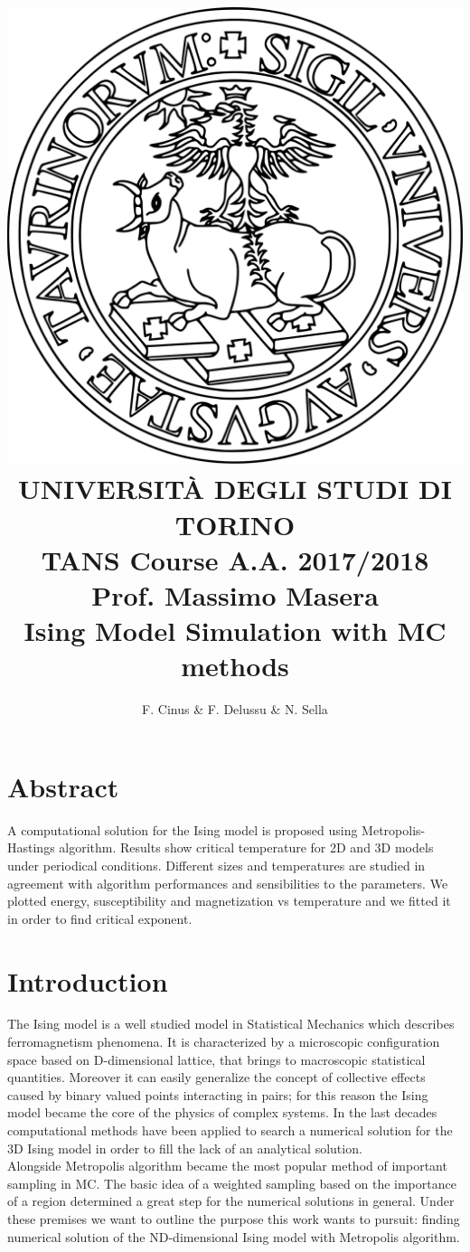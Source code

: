 \documentclass[11pt,a4paper]{article}
\author{F. Cinus \& F. Delussu \& N. Sella}
\title{\includegraphics[scale=0.12]{Unito-logo} \\ \LARGE{UNIVERSIT\`{A} DEGLI STUDI DI TORINO}
  \\
  TANS Course A.A. 2017/2018 Prof. Massimo Masera
  \\
  \textbf{Ising Model Simulation with MC methods}
}
\begin{document}
\date{}
\maketitle
\bigskip
\section*{Abstract}
A computational solution for the Ising model is proposed using Metropolis-Hastings algorithm. Results show critical temperature for 2D and 3D models under periodical conditions. Different sizes and temperatures are studied in agreement with algorithm performances and sensibilities to the parameters. We plotted energy, susceptibility and magnetization vs temperature and we fitted it in order to find critical exponent.


\newpage
\section*{Introduction}
The Ising model is a well studied model in Statistical Mechanics which describes ferromagnetism phenomena. It is characterized by a microscopic configuration space based on D-dimensional lattice, that brings to macroscopic statistical quantities. Moreover it can easily generalize the concept of collective effects caused by binary valued points interacting in pairs; for this reason the Ising model became the core of the physics of complex systems. In the last decades computational methods have been applied to search a numerical solution for the 3D Ising model in order to  fill the lack of an analytical solution.
\\
Alongside Metropolis algorithm became the most popular method of important sampling in MC. The basic idea of a weighted sampling based on the importance of a region determined a great step for the numerical solutions in general. Under these premises we want to outline the purpose this work wants to pursuit: finding numerical solution of the ND-dimensional Ising model with Metropolis algorithm.
\end{document}
